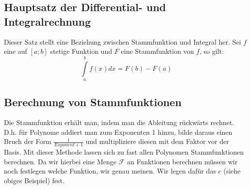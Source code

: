 \subsection{Hauptsatz der Differential- und Integralrechnung}
Dieser Satz stellt eine Beziehung zwischen Stammfunktion und Integral her. Sei $f$ eine auf $\left[a; b\right]$ stetige Funktion und $F$ eine Stammfunktion von $f$, so gilt:
\begin{equation*}
\int\limits_a^b f(x) dx = F(b) - F(a)
\end{equation*}
 


\subsection{Berechnung von Stammfunktionen}
Die Stammfunktion erhält man, indem man die Ableitung rückwärts rechnet. D.h. für Polynome addiert man zum Exponenten 1 hinzu, bilde daraus einen Bruch der Form $\frac{1}{Exponent+1}$ und multipliziere diesen mit dem Faktor vor der Basis. Mit dieser Methode lassen sich zu fast allen Polynomen Stammfunktionen berechnen. Da wir hierbei eine Menge $\mathcal{F}$ an Funktionen berechnen müssen wir noch festlegen welche Funktion, wir genau meinen. Wir legen dafür das $c$ (siehe obiges Beispiel) fest.

